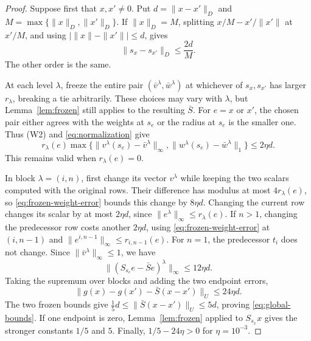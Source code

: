\begin{proof}
Suppose first that \(x,x'\ne0\). Put
\(d=\|x-x'\|_D\) and \(M=\max\{\|x\|_D,\|x'\|_D\}\).
If \(\|x\|_D=M\), splitting
\(x/M-x'/\|x'\|\) at \(x'/M\), and using
\(|\|x\|-\|x'\||\leq d\), gives
\begin{equation}
                       \|s_x-s_{x'}\|_D\leq\frac{2d}{M}.     \label{eq:normalization}
\end{equation}
The other order is the same.

At each level \(\lambda\), freeze the entire pair
\((\bar v^\lambda,\bar w^\lambda)\) at whichever of \(s_x,s_{x'}\)
has larger \(r_\lambda\), breaking a tie arbitrarily. These choices
may vary with \(\lambda\), but Lemma~\ref{lem:frozen} still applies
to the resulting \(\bar S\). For \(e=x\) or \(x'\), the chosen pair
either agrees with the weights at \(s_e\) or the radius at \(s_e\)
is the smaller one. Thus (W2) and \eqref{eq:normalization} give
\begin{equation}
 r_\lambda(e)
 \max\{\|v^\lambda(s_e)-\bar v^\lambda\|_\infty,
       \|w^\lambda(s_e)-\bar w^\lambda\|_1\}
 \leq2\eta d.                                                \label{eq:frozen-weight-error}
\end{equation}
This remains valid when \(r_\lambda(e)=0\).

In block \(\lambda=(i,n)\), first change its vector \(v^\lambda\)
while keeping the two scalars computed with the original rows.
Their difference has modulus at most \(4r_\lambda(e)\), so \eqref{eq:frozen-weight-error}
bounds this change by \(8\eta d\). Changing the current row changes
its scalar by at most \(2\eta d\), since
\(\|e^\lambda\|_\infty\leq r_\lambda(e)\). If \(n>1\), changing the
predecessor row costs another \(2\eta d\), using \eqref{eq:frozen-weight-error} at \((i,n-1)\)
and \(\|e^{i,n-1}\|_\infty\leq r_{i,n-1}(e)\). For \(n=1\), the
predecessor \(t_i\) does not change. Since
\(\|\bar v^\lambda\|_\infty\leq1\), we have
\begin{equation}
              \|(S_{s_e}e-\bar S e)^\lambda\|_\infty
                    \leq12\eta d.                            \label{eq:frozen-block-error}
\end{equation}
Taking the supremum over blocks and adding the two endpoint errors,
\[
       \|g(x)-g(x')-\bar S(x-x')\|_U\leq24\eta d.
\]
The two frozen bounds give
\(\frac15d\leq\|\bar S(x-x')\|_U\leq5d\), proving \eqref{eq:global-bounds}.
If one endpoint is zero, Lemma~\ref{lem:frozen} applied to
\(S_{s_x}x\) gives the stronger constants \(1/5\) and \(5\).
Finally, \(1/5-24\eta>0\) for \(\eta=10^{-3}\).
\end{proof}

